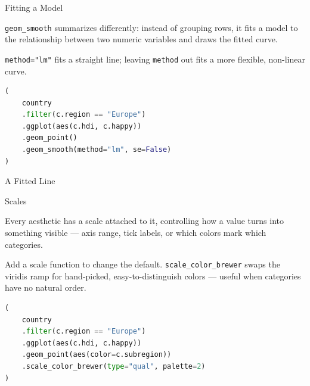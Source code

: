 \documentclass[8pt,aspectratio=169]{beamer}
\begin{document}
\begin{frame}[fragile]{Fitting a Model}
\begin{splitcode}{%

\texttt{geom\_smooth} summarizes differently: instead of grouping rows, it fits a model to the relationship between two numeric variables and draws the fitted curve.

\texttt{method="lm"} fits a straight line; leaving \texttt{method} out fits a more flexible, non-linear curve.

}
\begin{lstlisting}[language=Python]
(
    country
    .filter(c.region == "Europe")
    .ggplot(aes(c.hdi, c.happy))
    .geom_point()
    .geom_smooth(method="lm", se=False)
)
\end{lstlisting}
\end{splitcode}
\end{frame}

\begin{rightframe}{A Fitted Line}
\end{rightframe}

\begin{frame}[fragile]{Scales}
\begin{splitcode}{%

Every aesthetic has a scale attached to it, controlling how a value turns into something visible --- axis range, tick labels, or which colors mark which categories.

Add a scale function to change the default. \texttt{scale\_color\_brewer} swaps the viridis ramp for hand-picked, easy-to-distinguish colors --- useful when categories have no natural order.

}
\begin{lstlisting}[language=Python]
(
    country
    .filter(c.region == "Europe")
    .ggplot(aes(c.hdi, c.happy))
    .geom_point(aes(color=c.subregion))
    .scale_color_brewer(type="qual", palette=2)
)
\end{lstlisting}
\end{splitcode}
\end{frame}
\end{document}
